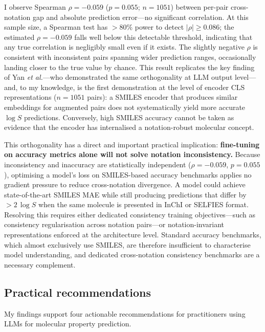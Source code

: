 \documentclass[twoside,twocolumn,9pt]{article}
\newcommand{\logS}{\ensuremath{\log S}}
\begin{document}
I observe Spearman $\rho = -0.059$ ($p=0.055$; $n=1051$) between per-pair cross-notation gap and absolute prediction error---no significant correlation. At this sample size, a Spearman test has $>80\%$ power to detect $|\rho|\geq 0.086$; the estimated $\rho=-0.059$ falls well below this detectable threshold, indicating that any true correlation is negligibly small even if it exists. The slightly negative $\rho$ is consistent with inconsistent pairs spanning wider prediction ranges, occasionally landing closer to the true value by chance. This result replicates the key finding of Yan \textit{et al.}\cite{yan2025}---who demonstrated the same orthogonality at LLM output level---and, to my knowledge, is the first demonstration at the level of encoder CLS representations ($n=1051$ pairs): a SMILES encoder that produces similar embeddings for augmented pairs does not systematically yield more accurate $\logS$ predictions. Conversely, high SMILES accuracy cannot be taken as evidence that the encoder has internalised a notation-robust molecular concept.

This orthogonality has a direct and important practical implication: \textbf{fine-tuning on accuracy metrics alone will not solve notation inconsistency.} Because inconsistency and inaccuracy are statistically independent ($\rho=-0.059$, $p=0.055$), optimising a model's loss on SMILES-based accuracy benchmarks applies no gradient pressure to reduce cross-notation divergence. A model could achieve state-of-the-art SMILES MAE while still producing predictions that differ by $>2\,\logS$ when the same molecule is presented in InChI or SELFIES format. Resolving this requires either dedicated consistency training objectives---such as consistency regularisation across notation pairs---or notation-invariant representations enforced at the architecture level. Standard accuracy benchmarks, which almost exclusively use SMILES,\cite{ganeeva2025} are therefore insufficient to characterise model understanding, and dedicated cross-notation consistency benchmarks are a necessary complement.

\subsection{Practical recommendations}
\label{sec:recommend}

My findings support four actionable recommendations for practitioners using LLMs for molecular property prediction.
\end{document}
